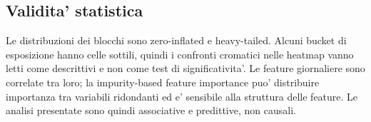 \subsection{Validita' statistica}

Le distribuzioni dei blocchi sono zero-inflated e heavy-tailed. Alcuni bucket di esposizione hanno celle sottili, quindi i confronti cromatici nelle heatmap vanno letti come descrittivi e non come test di significativita'. Le feature giornaliere sono correlate tra loro; la impurity-based feature importance puo' distribuire importanza tra variabili ridondanti ed e' sensibile alla struttura delle feature. Le analisi presentate sono quindi associative e predittive, non causali.
